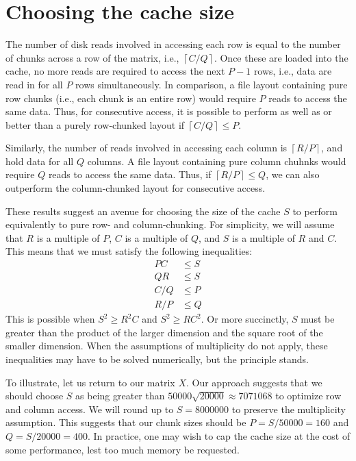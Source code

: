 \documentclass{article}
\providecommand{\myceil}[1]{\left \lceil #1 \right \rceil }
\begin{document}
\section*{Choosing the cache size}
The number of disk reads involved in accessing each row is equal to the number of chunks across a row of the matrix, i.e., $\myceil{C/Q}$.
Once these are loaded into the cache, no more reads are required to access the next $P-1$ rows, i.e., data are read in for all $P$ rows simultaneously.
In comparison, a file layout containing pure row chunks (i.e., each chunk is an entire row) would require $P$ reads to access the same data.
Thus, for consecutive access, it is possible to perform as well as or better than a purely row-chunked layout if $\myceil{C/Q} \le P$.

Similarly, the number of reads involved in accessing each column is $\myceil{R/P}$, and hold data for all $Q$ columns.
A file layout containing pure column chuhnks would require $Q$ reads to access the same data.
Thus, if $\myceil{R/P} \le Q$, we can also outperform the column-chunked layout for consecutive access.

These results suggest an avenue for choosing the size of the cache $S$ to perform equivalently to pure row- and column-chunking.
For simplicity, we will assume that $R$ is a multiple of $P$, $C$ is a multiple of $Q$, and $S$ is a multiple of $R$ and $C$.
This means that we must satisfy the following inequalities:
\begin{align*}
    PC &\le S \\
    QR &\le S \\
    C/Q &\le P \\ 
    R/P &\le Q 
\end{align*}
This is possible when $S^2 \ge R^2C$ and $S^2 \ge RC^2$.
Or more succinctly, $S$ must be greater than the product of the larger dimension and the square root of the smaller dimension.
When the assumptions of multiplicity do not apply, these inequalities may have to be solved numerically, but the principle stands.

To illustrate, let us return to our matrix $X$.
Our approach suggests that we should choose $S$ as being greater than $50000\sqrt{20000} \approx 7071068$ to optimize row and column access.
We will round up to $S=8000000$ to preserve the multiplicity assumption.
This suggests that our chunk sizes should be $P = S/50000 = 160$ and $Q = S/20000 = 400$.
In practice, one may wish to cap the cache size at the cost of some performance, lest too much memory be requested.
\end{document}
